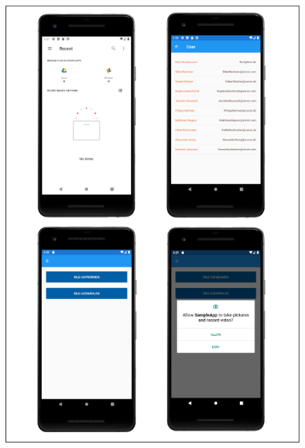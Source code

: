 \newpage
\begin{figure}[ht!]
 \includegraphics[width=\textwidth,keepaspectratio]{Images/Screenshot/AndroidScreenshot2.png}
\end{figure}

